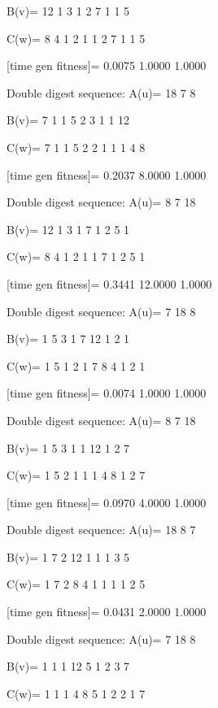 B(v)=
    12     1     3     1     2     7     1     1     5

C(w)=
     8     4     1     2     1     1     2     7     1     1     5

[time gen fitness]=
    0.0075    1.0000    1.0000

Double digest sequence:
A(u)=
    18     7     8

B(v)=
     7     1     1     5     2     3     1     1    12

C(w)=
     7     1     1     5     2     2     1     1     1     4     8

[time gen fitness]=
    0.2037    8.0000    1.0000

Double digest sequence:
A(u)=
     8     7    18

B(v)=
    12     1     3     1     7     1     2     5     1

C(w)=
     8     4     1     2     1     1     7     1     2     5     1

[time gen fitness]=
    0.3441   12.0000    1.0000

Double digest sequence:
A(u)=
     7    18     8

B(v)=
     1     5     3     1     7    12     1     2     1

C(w)=
     1     5     1     2     1     7     8     4     1     2     1

[time gen fitness]=
    0.0074    1.0000    1.0000

Double digest sequence:
A(u)=
     8     7    18

B(v)=
     1     5     3     1     1    12     1     2     7

C(w)=
     1     5     2     1     1     1     4     8     1     2     7

[time gen fitness]=
    0.0970    4.0000    1.0000

Double digest sequence:
A(u)=
    18     8     7

B(v)=
     1     7     2    12     1     1     1     3     5

C(w)=
     1     7     2     8     4     1     1     1     1     2     5

[time gen fitness]=
    0.0431    2.0000    1.0000

Double digest sequence:
A(u)=
     7    18     8

B(v)=
     1     1     1    12     5     1     2     3     7

C(w)=
     1     1     1     4     8     5     1     2     2     1     7

